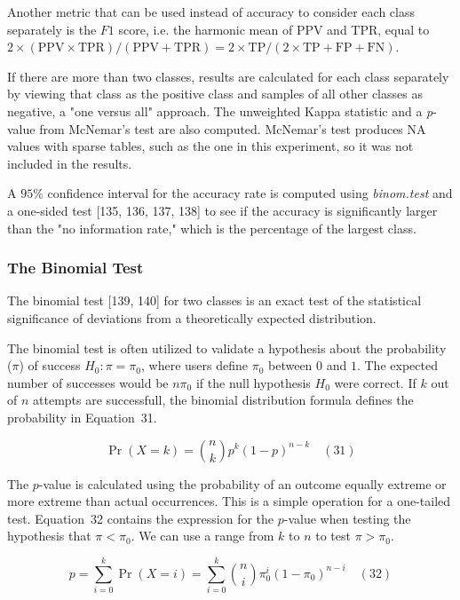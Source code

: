 \documentclass[preprint,12pt]{elsarticle}
\begin{document}
Another metric that can be used instead of accuracy to consider each class separately is the $F1$ score, i.e. the harmonic mean of PPV and TPR, equal to $2 \times (\mathrm{PPV} \times \mathrm{TPR}) / (\mathrm{PPV} + \mathrm{TPR}) = 2 \times \mathrm{TP} / (2 \times \mathrm{TP} + \mathrm{FP} + \mathrm{FN})$.

If there are more than two classes, results are calculated for each class separately by viewing that class as the positive class and samples of all other classes as negative, a "one versus all" approach.
The unweighted Kappa statistic and a \textit{p}-value from McNemar's test are also computed. McNemar's test produces NA values with sparse tables, such as the one in this experiment, so it was not included in the results.

A $95\%$ confidence interval for the accuracy rate is computed using \textit{binom.test} and a one-sided test [135, 136, 137, 138] to see if the accuracy is significantly larger than the "no information rate," which is the percentage of the largest class.

\subsubsection{The Binomial Test}

The binomial test [139, 140] for two classes is an exact test of the statistical significance of deviations from a theoretically expected distribution.

The binomial test is often utilized to validate a hypothesis about the probability ($\pi$) of success 
$H_{0}\colon \pi =\pi_{0}$, where users define $\pi_{0}$ between $0$ and $1$. The expected number of successes would be $n\pi_{0}$ if the null hypothesis $H_{0}$ were correct. If $k$ out of $n$ attempts are successfull, the binomial distribution formula defines the probability in Equation~31.

\begin{equation}
	\Pr(X=k)={\binom{n}{k}}p^{k}(1-p)^{n-k}
	\quad\left(31\right)
\end{equation}

The $p$-value is calculated using the probability of an outcome equally extreme or more extreme than actual occurrences. This is a simple operation for a one-tailed test. Equation~32 contains the expression for the $p$-value when testing the hypothesis that $\pi <\pi_{0}$. We can use a range from $k$ to $n$ to test $\pi >\pi_{0}$.

\begin{equation}
	p=\sum_{i=0}^{k}\Pr(X=i)=\sum_{i=0}^{k}{\binom{n}{i}}\pi_{0}^{i}(1-\pi_{0})^{n-i}
	\quad\left(32\right)
\end{equation}
\end{document}
